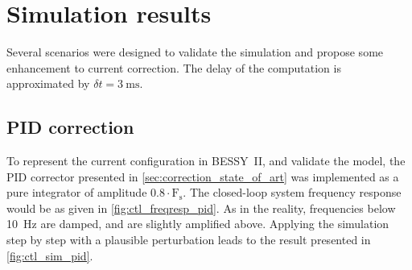 \section{Simulation results}
Several scenarios were designed to validate the simulation and propose some enhancement to current correction. The delay of the computation is approximated by $\delta t = \SI{3}{\milli\second}$.
 
\subsection{PID correction}
To represent the current configuration in BESSY~II, and validate the model, the PID corrector presented in \cref{sec:correction_state_of_art} was implemented as a pure integrator of amplitude $0.8\cdot \mathrm{F_s}$. The closed-loop system frequency response would be as given in \cref{fig:ctl_freqresp_pid}. As in the reality, frequencies below \SI{10}{\hertz} are damped, and are slightly amplified above. Applying the simulation step by step with a plausible perturbation leads to the result presented in \cref{fig:ctl_sim_pid}.

